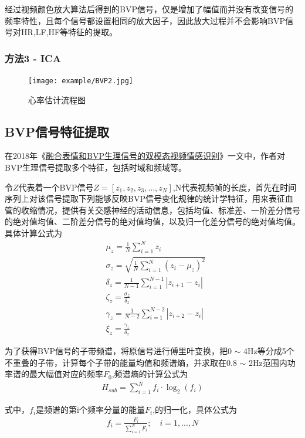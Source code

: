 经过视频颜色放大算法后得到的BVP信号，仅是增加了幅值而并没有改变信号的频率特性，且每个信号都设置相同的放大因子，因此放大过程并不会影响BVP信号对HR,LF,HF等特征的提取。

\subsubsection{方法3 - ICA}

\begin{figure}[!htp]
\centering
\texttt{[image: example/BVP2.jpg]}
\caption{心率估计流程图}
\label{fig1:4-1}
\end{figure}


\subsection{BVP信号特征提取}

在2018年《\href{https://xueshu.baidu.com/usercenter/paper/show?paperid=b22a6ba0c40126662ef983f6c530096d&site=xueshu_se&hitarticle=1}{融合表情和BVP生理信号的双模态视频情感识别}》一文中，作者对BVP生理信号提取多个特征，包括时域和频域等。

令$Z$代表着一个BVP信号$Z=[z_1,z_2,z_3,...,z_N]$,N代表视频帧的长度，首先在时间序列上对该信号提取下列能够反映BVP信号变化规律的统计学特征，用来表征血管的收缩情况，提供有关交感神经的活动信息，包括均值、标准差、一阶差分信号的绝对值均值、二阶差分信号的绝对值均值，以及归一化差分信号的绝对值均值。具体计算公式为
\begin{align}
& \mu_z = \frac{1}{N} \sum_{i=1}^N z_i \\
& \sigma_z = \sqrt{\frac{1}{N} \sum_{i = 1}^N(z_i - \mu_z)^2} \\
& \delta_z = \frac{1}{N - 1} \sum_{i = 1}^{N - 1}|z_{i+1} - z_i| \\
& \zeta_z = \frac{\sigma_z}{\delta_z} \\
& \gamma_z = \frac{1}{N-2} \sum_{i=1}^{N-2} |z_{i+2} - z_i| \\
& \xi_z = \frac{\gamma_z}{\delta_z}
\end{align}

为了获得BVP信号的子带频谱，将原信号进行傅里叶变换，把0 $\sim$ 4Hz等分成5个不重叠的子带，计算每个子带的能量均值和频谱熵，并求取在0.8 $\sim$ 2Hz范围内功率谱的最大幅值对应的频率$F_0$,频谱熵的计算公式为
\begin{align}
H_{sub} = \sum_{i = 1}^N f_i \cdot \log_2(f_i)
\end{align}

式中，$f_i$是频谱的第i个频率分量的能量$F_i$,的归一化，具体公式为
\begin{align}
f_i = \frac{F_i}{\sum_{i=1}^N F_i}; \quad i=1,...,N
\end{align}

